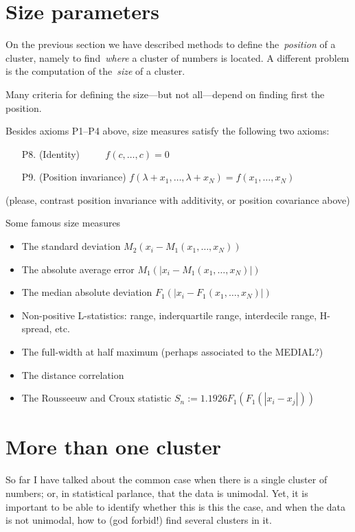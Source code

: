 \documentclass[a4paper]{article}
\begin{document}
\clearpage
\section{Size parameters}

On the previous section we have described methods to define
the~\emph{position} of a cluster, namely to find~\emph{where} a cluster of numbers is located.  A different
problem is the computation of the~\emph{size} of a cluster.

Many criteria for defining the size---but not all---depend on finding
first the position.

Besides axioms P1--P4 above, size measures satisfy the following two
axioms:
\begin{itemize}
	\item[P8.]
		(Identity)
		$\qquad$
		$f(c,\ldots,c)=0$
	\item[P9.]
		(Position invariance)
		$f(\lambda+x_1,\ldots,\lambda+x_N)
		=f(x_1,\ldots,x_N)$
\end{itemize}

(please, contrast position invariance with additivity, or position
covariance above)

Some famous size measures
\begin{itemize}
	\item The standard deviation $M_2(x_i-M_1(x_1,\ldots,x_N))$
	\item The absolute average error $M_1(|x_i-M_1(x_1,\ldots,x_N)|)$
	\item The median absolute deviation $F_1(|x_i-F_1(x_1,\ldots,x_N)|)$
	\item Non-positive L-statistics: range, inderquartile range,
		interdecile range, H-spread, etc.
	\item The full-width at half maximum (perhaps associated to the
		MEDIAL?)
	\item The distance correlation
	\item The Rousseeuw and Croux statistic $S_n := 1.1926
		F_1(F_1(|x_i-x_j|))$
\end{itemize}

\clearpage
\section{More than one cluster}

So far I have talked about the common case when there is a single
cluster of numbers; or, in statistical parlance, that the data is
unimodal.  Yet, it is important to be able to identify whether this
is this the case, and when the data is not unimodal, how to (god
forbid!) find several clusters in it.
\end{document}
